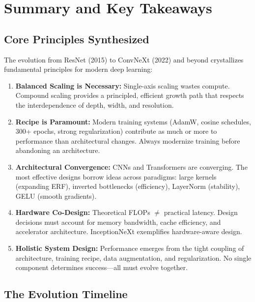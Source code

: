 \documentclass{article}
\begin{document}
\section{Summary and Key Takeaways}

\subsection{Core Principles Synthesized}

The evolution from ResNet (2015) to ConvNeXt (2022) and beyond crystallizes fundamental principles for modern deep learning:

\begin{enumerate}
    \item \textbf{Balanced Scaling is Necessary:} Single-axis scaling wastes compute. Compound scaling provides a principled, efficient growth path that respects the interdependence of depth, width, and resolution.
    
    \item \textbf{Recipe is Paramount:} Modern training systems (AdamW, cosine schedules, 300+ epochs, strong regularization) contribute as much or more to performance than architectural changes. Always modernize training before abandoning an architecture.
    
    \item \textbf{Architectural Convergence:} CNNs and Transformers are converging. The most effective designs borrow ideas across paradigms: large kernels (expanding ERF), inverted bottlenecks (efficiency), LayerNorm (stability), GELU (smooth gradients).
    
    \item \textbf{Hardware Co-Design:} Theoretical FLOPs $\neq$ practical latency. Design decisions must account for memory bandwidth, cache efficiency, and accelerator architecture. InceptionNeXt exemplifies hardware-aware design.
    
    \item \textbf{Holistic System Design:} Performance emerges from the tight coupling of architecture, training recipe, data augmentation, and regularization. No single component determines success---all must evolve together.
\end{enumerate}

\subsection{The Evolution Timeline}
\end{document}
